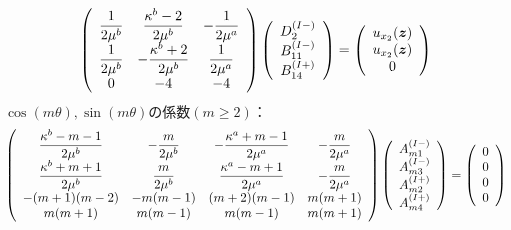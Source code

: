 \begin{align}
	\left(
	\begin{array}{ccc}
		{\displaystyle\frac{1}{2\mu^b}}& {\displaystyle\frac{\kappa^b-2}{2\mu^b}} & {\displaystyle-\frac{1}{2\mu^a}} \\
		{\displaystyle\frac{1}{2\mu^b}} & {\displaystyle-\frac{\kappa^b+2}{2\mu^b}} & {\displaystyle\frac{1}{2\mu^a}} \\
		0 & -4 & -4 \\
	\end{array}
	\right)
	\left(
	\begin{array}{c}
		D_{2}^{(I-)} \\
	 	B_{11}^{(I-)} \\
	 	B_{14}^{(I+)} \\
	\end{array}
	\right)
	=
	\left(
	\begin{array}{c}
		u_{x_{2}}(\bm{z}) \\
	 	u_{x_{2}}(\bm{z}) \\
	 	0 \\
	\end{array}
	\right)
\end{align}
\newpage
$\cos(m\theta),\sin(m\theta)$の係数$(m\geq2)$：
\begin{align}
	\left(
	\begin{array}{cccc}
		{\displaystyle\frac{ \kappa^b-m-1}{2\mu^{b}}}& {\displaystyle-\frac{m}{2\mu^{b}}} &
		{\displaystyle-\frac{\kappa^a+m-1}{2\mu^{a}}} & {\displaystyle-\frac{m}{2\mu^{a}}} \\
		{\displaystyle\frac{\kappa^b+m+1}{2\mu^{b}}} & {\displaystyle\frac{m}{2\mu^{b}}} &
		{\displaystyle\frac{\kappa^a-m+1}{2\mu^{a}}} & {\displaystyle-\frac{m}{2\mu^{a}}} \\
		-(m+1)(m-2) & -m(m-1) & (m+2)(m-1) & m(m+1) \\
		m(m+1) & m(m-1) & m(m-1) & m(m+1)\\
	\end{array}
	\right)
	\left(
	\begin{array}{c}
		A_{m1}^{(I-)} \\
	 	A_{m3}^{(I-)} \\
		A_{m2}^{(I+)}\\
	 	A_{m4}^{(I+)} \\
	\end{array}
	\right)
	=
	\left(
	\begin{array}{c}
		0 \\
	 	0 \\
		0 \\
	 	0 \\
	\end{array}
	\right)
\end{align}
